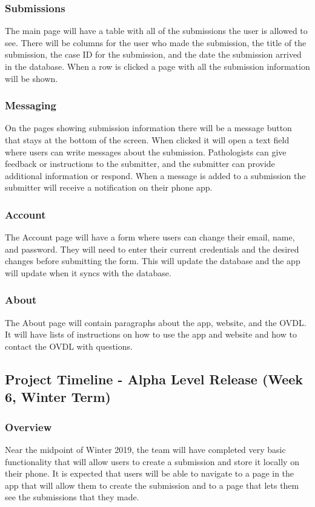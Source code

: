 \documentclass[onecolumn, draftclsnofoot,10pt, compsoc]{IEEEtran}
\begin{document}
\subsubsection{Submissions}
The main page will have a table with all of the submissions the user is allowed to see. There will be columns for the user who made the submission, the title of the submission, the case ID for the submission, and the date the submission arrived in the database. When a row is clicked a page with all the submission information will be shown. 

\subsubsection{Messaging}
On the pages showing submission information there will be a message button that stays at the bottom of the screen. When clicked it will open a text field where users can write messages about the submission. Pathologists can give feedback or instructions to the submitter, and the submitter can provide additional information or respond. When a message is added to a submission the submitter will receive a notification on their phone app. 

\subsubsection{Account}
The Account page will have a form where users can change their email, name, and password. They will need to enter their current credentials and the desired changes before submitting the form. This will update the database and the app will update when it syncs with the database. 

\subsubsection{About}
The About page will contain paragraphs about the app, website, and the OVDL. It will have lists of instructions on how to use the app and website and how to contact the OVDL with questions. 

\subsection{Project Timeline - Alpha Level Release (Week 6, Winter Term)}
\subsubsection{Overview}
Near the midpoint of Winter 2019, the team will have completed very basic functionality that will allow users to create a submission and store it locally on their phone. It is expected that users will be able to navigate to a page in the app that will allow them to create the submission and to a page that lets them see the submissions that they made.
\end{document}
